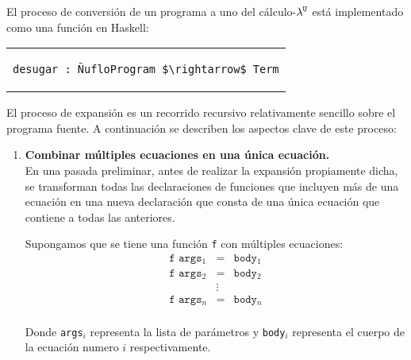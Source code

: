 El proceso de conversión de un programa \nuflo a
uno del cálculo-$\lambda^{\mathtt{U}}$ está implementado como una función
en Haskell:
\begin{center}
\begin{tabular}{c}
\begin{lstlisting}[mathescape=true]
desugar : ÑufloProgram $\rightarrow$ Term
\end{lstlisting}
\end{tabular}
\end{center}
El proceso de expansión es un recorrido recursivo
relativamente sencillo sobre el programa fuente.
A continuación se describen los aspectos clave de este proceso:

\begin{enumerate}
  \item {\bf Combinar múltiples ecuaciones en una única ecuación.} \\
    En una pasada preliminar, antes de realizar la expansión propiamente dicha,
    se transforman
    todas las declaraciones de funciones que incluyen más de una ecuación
    en una nueva declaración que consta de una única ecuación
    que contiene a todas las anteriores.

    Supongamos que se tiene una función \verb|f| con múltiples ecuaciones:
    \[
    \begin{array}{rcl}
      \texttt{f args$_1$}  & = & \texttt{body$_1$}\\
      \texttt{f args$_2$}  & = & \texttt{body$_2$}\\
      & \vdots \\
      \texttt{f args$_n$} & = & \texttt{body$_n$}\\
    \end{array}
    \]
    
    Donde \texttt{args$_i$} representa la lista de parámetros
    y \texttt{body$_i$} representa el cuerpo
    de la ecuación numero $i$ respectivamente.
    

\end{enumerate}
